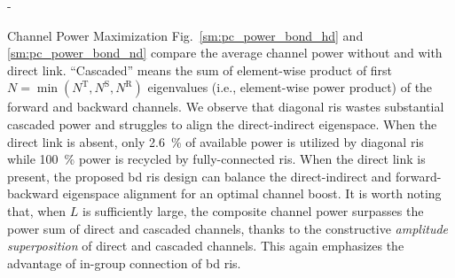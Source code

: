 \documentclass[journal]{IEEEtran}
\begin{document}
\begin{section}{-}
\begin{subsection}{Channel Power Maximization}
		Fig.~\ref{sm:pc_power_bond_hd} and \ref{sm:pc_power_bond_nd} compare the average channel power without and with direct link.
		``Cascaded'' means the sum of element-wise product of first $N = \min(N^\mathrm{T}, N^\mathrm{S}, N^\mathrm{R})$ eigenvalues (i.e., element-wise power product) of the forward and backward channels.
		We observe that diagonal \gls{ris} wastes substantial cascaded power and struggles to align the direct-indirect eigenspace.
		When the direct link is absent, only \qty{2.6}{\percent} of available power is utilized by diagonal \gls{ris} while \qty{100}{\percent} power is recycled by fully-connected \gls{ris}.
		When the direct link is present, the proposed \gls{bd} \gls{ris} design can balance the direct-indirect and forward-backward eigenspace alignment for an optimal channel boost.
		It is worth noting that, when $L$ is sufficiently large, the composite channel power surpasses the power sum of direct and cascaded channels, thanks to the constructive \emph{amplitude superposition} of direct and cascaded channels.
		This again emphasizes the advantage of in-group connection of \gls{bd} \gls{ris}.



\end{subsection}
\end{section}
\end{document}
